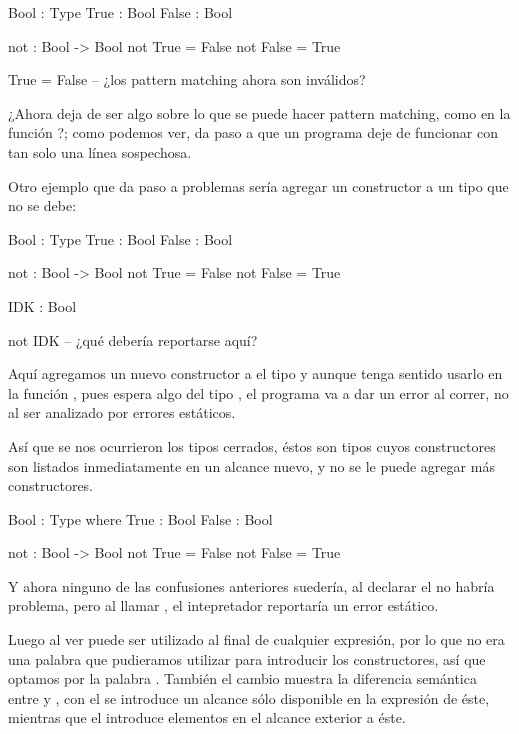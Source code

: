 {\begin{designfr}
\begin{anglercode}
Bool : Type
True : Bool
False : Bool

not : Bool -> Bool
not True = False
not False = True

True = False    -- ¿los pattern matching ahora son inválidos?
\end{anglercode}

¿Ahora  deja de ser algo sobre lo que se puede hacer pattern matching, como en la función ?; como podemos ver, da paso a que un programa deje de funcionar con tan solo una línea sospechosa.

Otro ejemplo que da paso a problemas sería agregar un constructor a un tipo que no se debe:

\begin{anglercode}
Bool : Type
True : Bool
False : Bool

not : Bool -> Bool
not True = False
not False = True

IDK : Bool

not IDK         -- ¿qué debería reportarse aquí?
\end{anglercode}

Aquí agregamos un nuevo constructor a el tipo  y aunque tenga sentido usarlo en la función , pues espera algo del tipo , el programa va a dar un error al correr, no al ser analizado por errores estáticos.

Así que se nos ocurrieron los tipos cerrados, éstos son tipos cuyos constructores son listados inmediatamente en un alcance nuevo, y no se le puede agregar más constructores.

\begin{anglercode}
Bool : Type where
    True : Bool
    False : Bool

not : Bool -> Bool
not True = False
not False = True
\end{anglercode}

Y ahora ninguno de las confusiones anteriores suedería, al declarar el  no habría problema, pero al llamar , el intepretador reportaría un error estático.

Luego al ver  puede ser utilizado al final de cualquier expresión, por lo que no era una palabra que pudieramos utilizar para introducir los constructores, así que optamos por la palabra . También el cambio muestra la diferencia semántica entre  y , con el  se introduce un alcance sólo disponible en la expresión de éste, mientras que el  introduce elementos en el alcance exterior a éste.


\end{designfr}}
